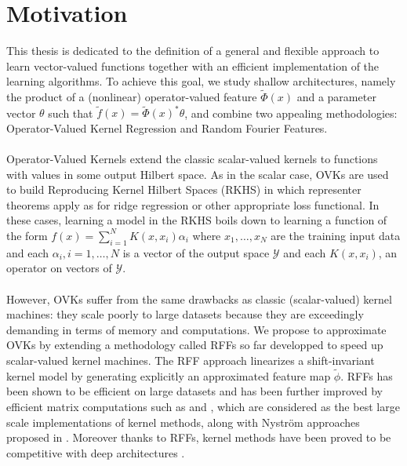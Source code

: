 \section{Motivation}
This thesis is dedicated to the definition of a general and flexible approach
to learn vector-valued functions together with an efficient implementation of
the learning algorithms. To achieve this goal, we study shallow architectures,
namely the product of a (nonlinear) operator-valued feature $\tilde{\Phi}(x)$
and a parameter vector $\theta$ such that $\tilde{f}(x) = \tilde{\Phi}(x)^*
\theta$, and combine two appealing methodologies: Operator-Valued Kernel
Regression and Random Fourier Features.
\paragraph{}
Operator-Valued Kernels \citep{Micchelli2005,Carmeli2010,Kadri_aistat10,
Brouard2011,Alvarez2012} extend the classic scalar-valued kernels to functions
with values in some output Hilbert space. As in the scalar case, \acfp{OVK} are
used to build Reproducing Kernel Hilbert Spaces (\acs{RKHS}) in which
representer theorems apply as for ridge regression or other appropriate loss
functional. In these cases, learning a model in the \acs{RKHS} boils down to
learning a function of the form $f(x)=\sum_{i=1}^N K(x,x_i)\alpha_i$ where
$x_1, \ldots, x_N$ are the training input data and each $\alpha_i, i=1, \ldots,
N$ is a vector of the output space $\mathcal{Y}$ and each $K(x,x_i)$, an
operator on vectors of $\mathcal{Y}$.
\paragraph{}
However, \acsp{OVK} suffer from the same drawbacks as classic (scalar-valued)
kernel machines: they scale poorly to large datasets because they are
exceedingly demanding in terms of memory and computations. We propose to
approximate OVKs by extending a methodology called \acfp{RFF}
\citep{Rahimi2007, Le2013, Yang2015, sriper2015, Bach2015, sutherland2015,
rudi2016generalization} so far developped to speed up scalar-valued kernel
machines. The \acs{RFF} approach linearizes a shift-invariant kernel model by
generating explicitly an approximated feature map $\tilde{\phi}$. \acsp{RFF}
has been shown to be efficient on large datasets and has been further improved
by efficient matrix computations such as \citep[``FastFood'']{Le2013} and
\citep[``SORF'']{felix2016orthogonal}, which are considered as the best large
scale implementations of kernel methods, along with Nystr\"om approaches
proposed in \citet{drineas2005nystrom}. Moreover thanks to \acsp{RFF}, kernel
methods have been proved to be competitive with deep architectures
\citep{lu2014scale, dai2014scalable, yang2015deep}.

